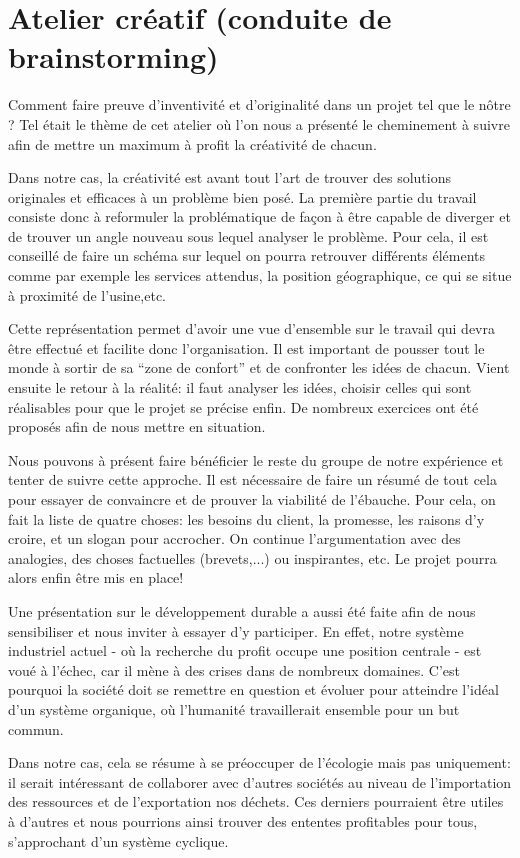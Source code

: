 \documentclass[a4paper, oneside, 12pt]{article}
\begin{document}
\section{Atelier créatif (conduite de brainstorming)}

Comment faire preuve d'inventivité et d'originalité dans un projet tel que le nôtre ?
Tel était le thème de cet atelier où l'on nous a présenté le cheminement 
à suivre afin de mettre un maximum à profit la créativité de chacun.

Dans notre cas, la créativité est avant tout l'art de trouver des solutions 
originales et efficaces à un problème bien posé. 
La première partie du travail consiste donc à reformuler la problématique de façon 
à être capable de diverger et de trouver un angle nouveau sous lequel analyser le problème. 
Pour cela, il est conseillé de faire un schéma sur lequel on pourra retrouver différents
éléments comme par exemple les services attendus, la position géographique, 
ce qui se situe à proximité de l’usine,etc.

Cette représentation permet d'avoir une vue d'ensemble sur le travail qui 
devra être effectué et facilite donc l'organisation. Il est important de pousser tout
le monde à sortir de sa ``zone de confort'' et de confronter les idées de chacun.
Vient ensuite le retour à la réalité: il faut analyser les idées, choisir celles qui 
sont réalisables pour que le projet se précise enfin. De nombreux exercices ont été 
proposés afin de nous mettre en situation. 

Nous pouvons à présent faire bénéficier le reste du groupe de notre expérience et tenter
de suivre cette approche. Il est nécessaire de faire un résumé de tout cela pour essayer 
de convaincre et de prouver la viabilité de l'ébauche. Pour cela, on fait la liste 
de quatre choses: les besoins du client, la promesse, les raisons d'y croire, 
et un slogan pour accrocher. On continue l'argumentation avec des analogies,
des choses factuelles (brevets,...) ou inspirantes, etc. Le projet pourra alors
enfin être mis en place!

Une présentation sur le développement durable a aussi été faite afin de nous sensibiliser
et nous inviter à essayer d'y participer. 
En effet, notre système industriel actuel - où la recherche du profit occupe une position
centrale - est voué à l'échec, car il mène à des crises dans de nombreux domaines.
C'est pourquoi la société doit se remettre en question et évoluer pour atteindre
l'idéal d'un système organique, où l'humanité travaillerait ensemble pour un but commun. 

Dans notre cas, cela se résume à se préoccuper de l'écologie mais pas uniquement:
il serait intéressant de collaborer avec d'autres sociétés au niveau de l'importation
des ressources et de l'exportation nos déchets. Ces derniers pourraient être utiles
à d'autres et nous pourrions ainsi trouver des ententes profitables pour tous,
s'approchant d'un système cyclique.
\end{document}
